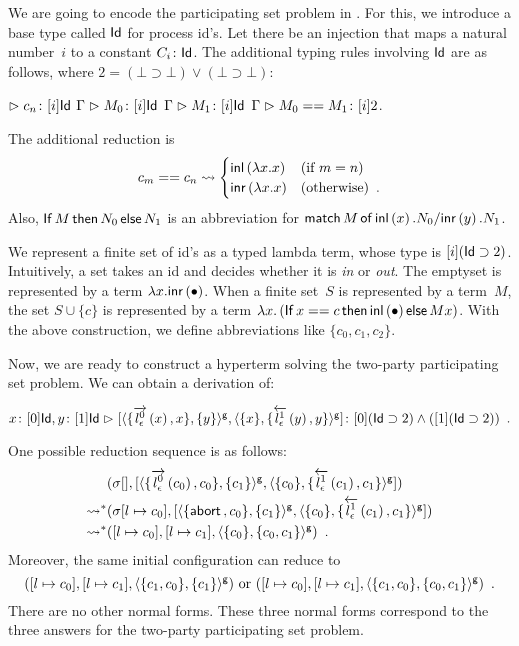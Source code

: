 {We are going to encode the participating set problem in \lgd.
For this, we introduce a base type called $\Id$ for process id's.
Let there be an injection that maps a natural number~$i$ to a constant
$C_i\colon\Id$.
The additional typing rules involving $\Id$ are as follows, where $2 = (\bot\supset\bot)\vee(\bot\supset\bot)$:
\begin{center}
 \UnaryRule{}{}
 {$\tr \tj{c_n}{[i]\Id}$}
 \hfill
 \BinaryRule
 {$\Gamma\tr \tj{M_0}[i]\Id$}
 {$\Gamma\tr \tj{M_1}[i]\Id$}
 {}
 {$\Gamma \tr \tj{\compare{M_0}{M_1}}{[i]2}$}\enspace.
\end{center}
The additional reduction is
\[
 c_m == c_n \reduce
\begin{cases}
 \linl{\lambda x.x}& (\text{if } m = n)\\
 \linr{\lambda x.x}& (\text{otherwise})\enspace.
\end{cases}
\]
Also,
${\ifte M {N_0} {N_1}}$
is an abbreviation for
${\lmat M x {N_0} y {N_1}}$.

We represent a finite set of id's as a
typed lambda term, whose type is $[i](\Id\supset 2)$.  Intuitively, a
set takes an id and decides whether it is \textit{in} or \textit{out}.
The emptyset is represented by a term $\lambda x. \linr {\bullet}$.
When a finite set~$S$ is represented by a term~$M$,
the set $S \cup \{c\}$ is represented by a term
$\lambda x.\left(\ifte{x==c}{\linl {\bullet}}{Mx}\right)$.
With the above construction, we define abbreviations
like $\{c_0, c_1, c_2\}$.

Now, we are ready to construct a hyperterm solving the two-party
participating set problem.
We can  obtain a derivation of:
\begin{center}
 \small
$
 \tj{x}{[0]\Id},
 \tj{y}{[1]\Id}
 \tr
 \tj{\cotuple{\gpair{\{\ltor 0 l \epsilon x, x\}, \{y\}},
 \gpair{\{x\}, \{\rtol 1 l\epsilon y, y\}}
 }}
 {[0](\Id\supset 2)\wedge ([1](\Id\supset 2))}\enspace.$
\end{center}

One possible reduction sequence is as follows:
\begin{align*}
 & \conf{[]}
 {\cotuple{\gpair{\{\ltor 0 l \epsilon {c_0}, {c_0}\}, \{{c_1}\}},
 \gpair {\{{c_0}\}, \{\rtol 1 l\epsilon {c_1}, {c_1}\}}}} \\
 \reduction &
 \conf{[l\mapsto {c_0}]}
 {
 \cotuple{
 \gpair{\{\abort, {c_0}\}, \{{c_1}\}},
 \gpair{\{{c_0}\}, \{\rtol 1 l\epsilon {c_1}, {c_1}\}}
 }
 }
 \\
 \reduction &
 \concreteconf{[l\mapsto {c_0}]}{[l\mapsto {c_1}]}{\gpair{\{{c_0}\}, \{c_0, c_1\}}}\enspace.
\end{align*}
Moreover, the same initial configuration can reduce to
\[
 \concreteconf{[l\mapsto c_0]}{[l\mapsto c_1]}{\gpair{\{c_1,c_0\},
 \{c_1\}}}\text{ or }
 \concreteconf{[l\mapsto c_0]}{[l\mapsto c_1]}{\gpair{\{c_1,c_0\},
 \{c_0, c_1\}}}\enspace.
\]
There are no other normal forms.
These three normal forms correspond to the three answers for the
two-party participating set problem.

}
